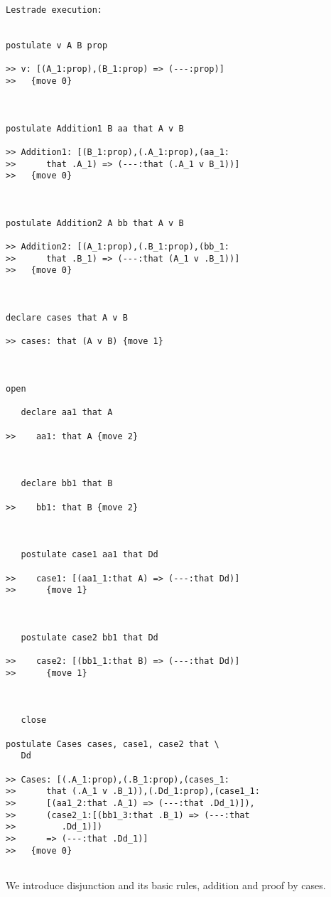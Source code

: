 \documentclass[12pt]{article}
\begin{document}
\begin{verbatim}Lestrade execution:


postulate v A B prop

>> v: [(A_1:prop),(B_1:prop) => (---:prop)]
>>   {move 0}



postulate Addition1 B aa that A v B

>> Addition1: [(B_1:prop),(.A_1:prop),(aa_1:
>>      that .A_1) => (---:that (.A_1 v B_1))]
>>   {move 0}



postulate Addition2 A bb that A v B

>> Addition2: [(A_1:prop),(.B_1:prop),(bb_1:
>>      that .B_1) => (---:that (A_1 v .B_1))]
>>   {move 0}



declare cases that A v B

>> cases: that (A v B) {move 1}



open

   declare aa1 that A

>>    aa1: that A {move 2}



   declare bb1 that B

>>    bb1: that B {move 2}



   postulate case1 aa1 that Dd

>>    case1: [(aa1_1:that A) => (---:that Dd)]
>>      {move 1}



   postulate case2 bb1 that Dd

>>    case2: [(bb1_1:that B) => (---:that Dd)]
>>      {move 1}



   close

postulate Cases cases, case1, case2 that \
   Dd

>> Cases: [(.A_1:prop),(.B_1:prop),(cases_1:
>>      that (.A_1 v .B_1)),(.Dd_1:prop),(case1_1:
>>      [(aa1_2:that .A_1) => (---:that .Dd_1)]),
>>      (case2_1:[(bb1_3:that .B_1) => (---:that
>>         .Dd_1)])
>>      => (---:that .Dd_1)]
>>   {move 0}


\end{verbatim}

We introduce disjunction and its basic rules, addition and proof by cases.
\end{document}
